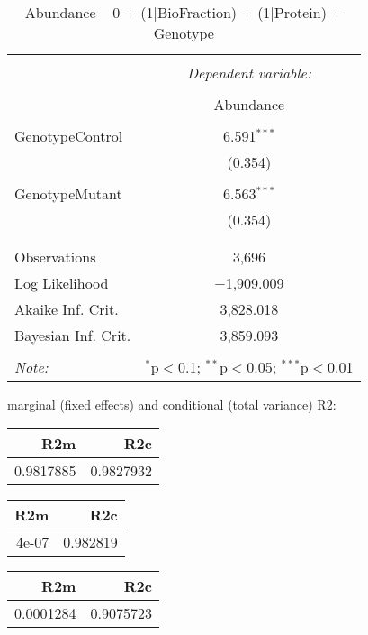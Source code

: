 \documentclass[11pt]{report}
\begin{document}
\begin{table}[!htbp] \centering 
  \caption{Abundance ~ 0 + (1|BioFraction) + (1|Protein) + Genotype} 
  \label{} 
\begin{tabular}{@{\extracolsep{5pt}}lc} 
\\[-1.8ex]\hline 
\hline \\[-1.8ex] 
 & \multicolumn{1}{c}{\textit{Dependent variable:}} \\ 
\cline{2-2} 
\\[-1.8ex] & Abundance \\ 
\hline \\[-1.8ex] 
 GenotypeControl & 6.591$^{***}$ \\ 
  & (0.354) \\ 
  & \\ 
 GenotypeMutant & 6.563$^{***}$ \\ 
  & (0.354) \\ 
  & \\ 
\hline \\[-1.8ex] 
Observations & 3,696 \\ 
Log Likelihood & $-$1,909.009 \\ 
Akaike Inf. Crit. & 3,828.018 \\ 
Bayesian Inf. Crit. & 3,859.093 \\ 
\hline 
\hline \\[-1.8ex] 
\textit{Note:}  & \multicolumn{1}{r}{$^{*}$p$<$0.1; $^{**}$p$<$0.05; $^{***}$p$<$0.01} \\ 
\end{tabular} 
\end{table} 
marginal (fixed effects) and conditional (total variance) R2:

\begin{tabular}{r|r}
\hline
R2m & R2c\\
\hline
0.9817885 & 0.9827932\\
\hline
\end{tabular}

\begin{tabular}{r|r}
\hline
R2m & R2c\\
\hline
4e-07 & 0.982819\\
\hline
\end{tabular}

\begin{tabular}{r|r}
\hline
R2m & R2c\\
\hline
0.0001284 & 0.9075723\\
\hline
\end{tabular}
\end{document}
